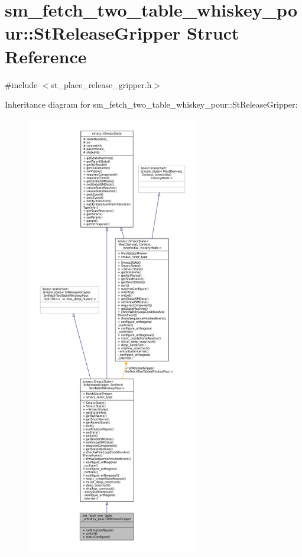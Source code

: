 \hypertarget{structsm__fetch__two__table__whiskey__pour_1_1StReleaseGripper}{}\section{sm\+\_\+fetch\+\_\+two\+\_\+table\+\_\+whiskey\+\_\+pour\+:\+:St\+Release\+Gripper Struct Reference}
\label{structsm__fetch__two__table__whiskey__pour_1_1StReleaseGripper}


{\ttfamily \#include $<$st\+\_\+place\+\_\+release\+\_\+gripper.\+h$>$}



Inheritance diagram for sm\+\_\+fetch\+\_\+two\+\_\+table\+\_\+whiskey\+\_\+pour\+:\+:St\+Release\+Gripper\+:
\nopagebreak
\begin{figure}[H]
\begin{center}
\leavevmode
\includegraphics[height=550pt]{structsm__fetch__two__table__whiskey__pour_1_1StReleaseGripper__inherit__graph}
\end{center}
\end{figure}


